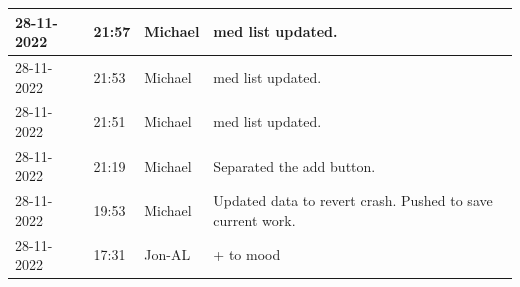 \documentclass[11pt]{article}
\begin{document}
\begin{center}
\begin{longtable}{|p{2cm}|l|p{2cm}|p{10.5cm}|}
            28-11-2022                                 & 21:57                              & Michael                                 & med list updated.                                                                                                                                                                                                                                                                                            \\ \hline
            28-11-2022                                 & 21:53                              & Michael                                 & med list updated.                                                                                                                                                                                                                                                                                            \\ \hline
            28-11-2022                                 & 21:51                              & Michael                                 & med list updated.                                                                                                                                                                                                                                                                                            \\ \hline
            28-11-2022                                 & 21:19                              & Michael                                 & Separated the add button.                                                                                                                                                                                                                                                                                    \\ \hline
            28-11-2022                                 & 19:53                              & Michael                                 & Updated data to revert crash. Pushed to save current work.                                                                                                                                                                                                                                                   \\ \hline
            28-11-2022                                 & 17:31                              & Jon-AL                                  & + to mood                                                                                                                                                                                                                                                                                                    \\ \hline

\end{longtable}
\end{center}
\end{document}

